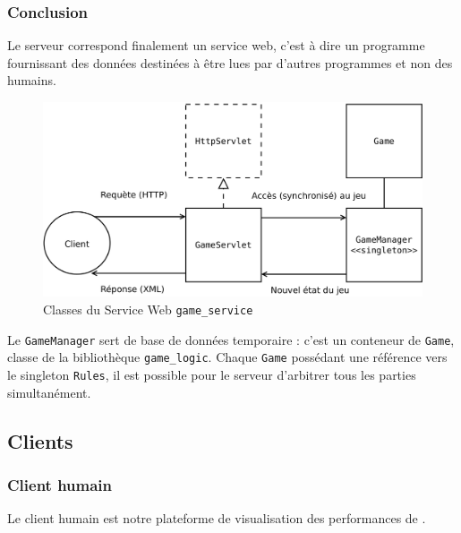 \subsubsection{Conclusion}
Le serveur correspond finalement un service web, c'est à dire un programme fournissant des données destinées à être lues par d'autres programmes et non des humains.
\begin{figure}[H] 
\centering
\includegraphics[width=\textwidth]{files/env/game_service} 
\caption{Classes du Service Web \texttt{game\_service}} 
\label{game_service}
\end{figure}
Le \texttt{GameManager} sert de base de données temporaire : c'est un conteneur de \texttt{Game}, classe de la bibliothèque \texttt{game\_logic}. Chaque \texttt{Game} possédant une référence vers le singleton \texttt{Rules}, il est possible pour le serveur d'arbitrer tous les parties simultanément.

\subsection{Clients}

\subsubsection{Client humain}
Le client humain est notre plateforme de visualisation des performances de \cogito{}.

